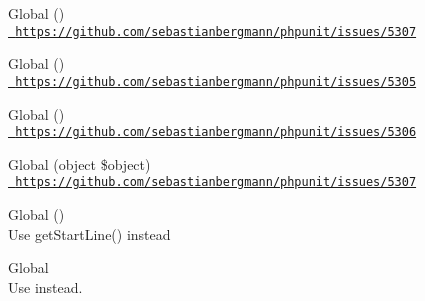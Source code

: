 \begin{DoxyRefList}
\item[Global \doxylink{class_p_h_p_unit_1_1_framework_1_1_mock_object_1_1_mock_builder_a5896d495f4fe2aa455c74a08316675b2}{Mock\+Builder\+::enable\+Proxying\+To\+Original\+Methods} ()]\hfill \\
\label{deprecated__deprecated000036}%
%
\href{https://github.com/sebastianbergmann/phpunit/issues/5307}{\texttt{ https\+://github.\+com/sebastianbergmann/phpunit/issues/5307}} 
\item[Global \doxylink{class_p_h_p_unit_1_1_framework_1_1_mock_object_1_1_mock_builder_a372a03ed414fc6235c9a09a39eb17e89}{Mock\+Builder\+::get\+Mock\+For\+Abstract\+Class} ()]\hfill \\
\label{deprecated__deprecated000029}%
%
\href{https://github.com/sebastianbergmann/phpunit/issues/5305}{\texttt{ https\+://github.\+com/sebastianbergmann/phpunit/issues/5305}}  
\item[Global \doxylink{class_p_h_p_unit_1_1_framework_1_1_mock_object_1_1_mock_builder_a54f678d907203b42b4c6b81672207d27}{Mock\+Builder\+::get\+Mock\+For\+Trait} ()]\hfill \\
\label{deprecated__deprecated000030}%
%
\href{https://github.com/sebastianbergmann/phpunit/issues/5306}{\texttt{ https\+://github.\+com/sebastianbergmann/phpunit/issues/5306}}  
\item[Global \doxylink{class_p_h_p_unit_1_1_framework_1_1_mock_object_1_1_mock_builder_afdd68f7bc55fe2d23e049930cc74ff22}{Mock\+Builder\+::set\+Proxy\+Target} (object \$object)]\hfill \\
\label{deprecated__deprecated000038}%
%
\href{https://github.com/sebastianbergmann/phpunit/issues/5307}{\texttt{ https\+://github.\+com/sebastianbergmann/phpunit/issues/5307}} 
\item[Global \doxylink{interface_php_parser_1_1_node_aef9c32f6066788a101028a1d4150f8cb}{Node\+::get\+Line} ()]\hfill \\
\label{deprecated__deprecated000004}%
%
Use get\+Start\+Line() instead  
\item[Global \doxylink{class_php_parser_1_1_node_traverser_a6d11bd165a2ecd3a965f1a64df677f96}{Node\+Traverser\+::DONT\+\_\+\+TRAVERSE\+\_\+\+CHILDREN} ]\hfill \\
\label{deprecated__deprecated000013}%
%
Use  instead.  

\end{DoxyRefList}
